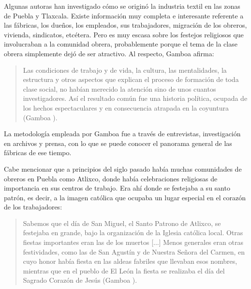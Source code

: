 \documentclass[14pt,letterpaper,twoside]{extbook} %
\begin{document}
\noindent Algunas autoras han investigado cómo se originó la industria textil en las zonas de Puebla y Tlaxcala. Existe información muy completa e interesante referente a las fábricas, los dueños, los empleados, sus trabajadores, migración de los obreros, vivienda, sindicatos, etcétera. Pero es muy escasa sobre los festejos religiosos que involucraban a la comunidad obrera, probablemente porque el tema de la clase obrera simplemente dejó de ser atractivo. Al respecto, Gamboa afirma:

\begin{quotation}
\noindent Las condiciones de trabajo y de vida, la cultura, las mentalidades, la estructura y otros aspectos que explican el proceso de formación de toda clase social, no habían merecido la atención sino de unos cuantos investigadores. Así el resultado común fue una historia política, ocupada de los hechos espectaculares y en consecuencia atrapada en la coyuntura (Gamboa ).
\end{quotation}

\noindent La metodología empleada por Gamboa fue a través de entrevistas, investigación en archivos y prensa, con lo que se puede conocer el panorama general de las fábricas de ese tiempo.

Cabe mencionar que a principios del siglo pasado había muchas comunidades de obreros en Puebla como Atlixco, donde había celebraciones religiosas de importancia en sus centros de trabajo. Era ahí donde se festejaba a su santo patrón, es decir, a la imagen católica que ocupaba un lugar especial en el corazón de los trabajadores:

\begin{quotation}
\noindent Sabemos que el día de San Miguel, el Santo Patrono de Atlixco, se festejaba en grande, bajo la organización de la Iglesia católica local. Otras fiestas importantes eran las de los muertos [...] Menos generales eran otras festividades, como las de San Agustín y de Nuestra Señora del Carmen, en cuyo honor había fiesta en las aldeas fabriles que llevaban esos nombres, mientras que en el pueblo de El León la fiesta se realizaba el día del Sagrado Corazón de Jesús (Gamboa ).
\end{quotation}
\end{document}
